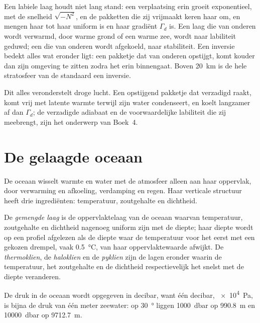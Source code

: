 Een labiele laag houdt niet lang stand: een verplaatsing erin groeit exponentieel, met de snelheid $\sqrt{-N^2}$, en de pakketten die zij vrijmaakt keren haar om, en mengen haar tot haar  uniform is en haar gradiënt $\Gamma_d$ is. Een laag die van onderen wordt verwarmd, door warme grond of een warme zee, wordt naar labiliteit geduwd; een die van onderen wordt afgekoeld, naar stabiliteit. Een inversie bedekt alles wat eronder ligt: een pakketje dat van onderen opstijgt, komt kouder dan zijn omgeving te zitten zodra het erin binnengaat. Boven \qty{20}{km} is de hele stratosfeer van de standaard een inversie.

Dit alles veronderstelt droge lucht. Een opstijgend pakketje dat verzadigd raakt, komt vrij met latente warmte terwijl zijn water condenseert, en koelt langzamer af dan $\Gamma_d$; de verzadigde adiabaat en de voorwaardelijke labiliteit die zij meebrengt, zijn het onderwerp van Boek~4.

\section{De gelaagde oceaan}\label{sec:b1:fluid-envelopes-structure:ocean}

De oceaan wisselt warmte en water met de atmosfeer alleen aan haar oppervlak, door verwarming en afkoeling, verdamping en regen. Haar verticale structuur heeft drie ingrediënten: temperatuur, zoutgehalte en dichtheid.

\begin{definition}\label{def:b1:fluid-envelopes-structure:ocean-layers}
De \emph{gemengde laag} is de oppervlaktelaag van de oceaan waarvan temperatuur, zoutgehalte en dichtheid nagenoeg uniform zijn met de diepte; haar diepte wordt op een profiel afgelezen als de diepte waar de temperatuur voor het eerst met een gekozen drempel, vaak \qty{0.5}{\celsius}, van haar oppervlaktewaarde afwijkt. De \emph{thermoklien}, de \emph{haloklien} en
de \emph{pyklien} zijn de lagen eronder waarin de temperatuur, het zoutgehalte en de dichtheid respectievelijk het snelst met de diepte veranderen.
\end{definition}

De druk in de oceaan wordt opgegeven in decibar, want één decibar, \qty{e4}{Pa}, is bijna de druk van één meter zeewater: op \qty{30}{\degree}  liggen \qty{1000}{dbar} op \qty{990.8}{m} en \qty{10000}{dbar} op \qty{9712.7}{m}.


